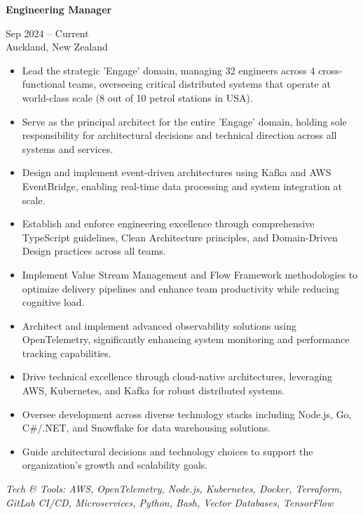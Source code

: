 \documentclass[10pt,a4paper,ragged2e,withhyper]{altacv}
\renewcommand{\cvevent}[4]{%
  \textbf{#1} %
  \hfill %
  \begin{minipage}[t]{.5\linewidth}
    \raggedleft %
    \small#3 %
    \\ %
    #4 %
  \end{minipage}
  \vspace{\baselineskip} %
}
\begin{document}



\cvevent{Engineering Manager}{Invenco by GVR}{Sep 2024 -- Current}{Auckland, New Zealand}

\begin{itemize}
  \item Lead the strategic 'Engage' domain, managing 32 engineers across 4 cross-functional teams, overseeing critical distributed systems that operate at world-class scale (8 out of 10 petrol stations in USA).
  \item Serve as the principal architect for the entire 'Engage' domain, holding sole responsibility for architectural decisions and technical direction across all systems and services.
  \item Design and implement event-driven architectures using Kafka and AWS EventBridge, enabling real-time data processing and system integration at scale.
  \item Establish and enforce engineering excellence through comprehensive TypeScript guidelines, Clean Architecture principles, and Domain-Driven Design practices across all teams.
  \item Implement Value Stream Management and Flow Framework methodologies to optimize delivery pipelines and enhance team productivity while reducing cognitive load.
  \item Architect and implement advanced observability solutions using OpenTelemetry, significantly enhancing system monitoring and performance tracking capabilities.
  \item Drive technical excellence through cloud-native architectures, leveraging AWS, Kubernetes, and Kafka for robust distributed systems.
  \item Oversee development across diverse technology stacks including Node.js, Go, C\#/.NET, and Snowflake for data warehousing solutions.
  \item Guide architectural decisions and technology choices to support the organization's growth and scalability goals.
  \end{itemize}

\vspace{0.5cm}

\textit{Tech \& Tools: AWS, OpenTelemetry, Node.js, Kubernetes, Docker, Terraform, GitLab CI/CD, Microservices, Python, Bash, Vector Databases, TensorFlow}

\divider
\end{document}
